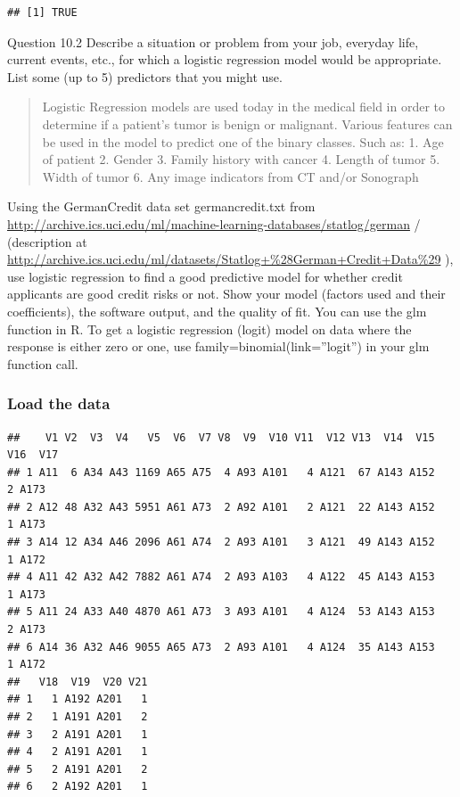 \documentclass[]{article}
\newenvironment{Shaded}{\begin{snugshade}}{\end{snugshade}}
\newcommand{\KeywordTok}[1]{\textcolor[rgb]{0.13,0.29,0.53}{\textbf{#1}}}
\newcommand{\DataTypeTok}[1]{\textcolor[rgb]{0.13,0.29,0.53}{#1}}
\newcommand{\StringTok}[1]{\textcolor[rgb]{0.31,0.60,0.02}{#1}}
\newcommand{\OtherTok}[1]{\textcolor[rgb]{0.56,0.35,0.01}{#1}}
\newcommand{\OperatorTok}[1]{\textcolor[rgb]{0.81,0.36,0.00}{\textbf{#1}}}
\newcommand{\NormalTok}[1]{#1}
\begin{document}
\begin{verbatim}
## [1] TRUE
\end{verbatim}

Question 10.2 Describe a situation or problem from your job, everyday
life, current events, etc., for which a logistic regression model would
be appropriate. List some (up to 5) predictors that you might use.

\begin{quote}
Logistic Regression models are used today in the medical field in order
to determine if a patient's tumor is benign or malignant. Various
features can be used in the model to predict one of the binary classes.
Such as: 1. Age of patient 2. Gender 3. Family history with cancer 4.
Length of tumor 5. Width of tumor 6. Any image indicators from CT and/or
Sonograph
\end{quote}

Using the GermanCredit data set germancredit.txt from
\url{http://archive.ics.uci.edu/ml/machine-learning-databases/statlog/german}
/ (description at
\url{http://archive.ics.uci.edu/ml/datasets/Statlog+\%28German+Credit+Data\%29}
), use logistic regression to find a good predictive model for whether
credit applicants are good credit risks or not. Show your model (factors
used and their coefficients), the software output, and the quality of
fit. You can use the glm function in R. To get a logistic regression
(logit) model on data where the response is either zero or one, use
family=binomial(link=''logit'') in your glm function call.

\subsubsection{Load the data}\label{load-the-data}

\begin{Shaded}
\end{Shaded}

\begin{verbatim}
##    V1 V2  V3  V4   V5  V6  V7 V8  V9  V10 V11  V12 V13  V14  V15 V16  V17
## 1 A11  6 A34 A43 1169 A65 A75  4 A93 A101   4 A121  67 A143 A152   2 A173
## 2 A12 48 A32 A43 5951 A61 A73  2 A92 A101   2 A121  22 A143 A152   1 A173
## 3 A14 12 A34 A46 2096 A61 A74  2 A93 A101   3 A121  49 A143 A152   1 A172
## 4 A11 42 A32 A42 7882 A61 A74  2 A93 A103   4 A122  45 A143 A153   1 A173
## 5 A11 24 A33 A40 4870 A61 A73  3 A93 A101   4 A124  53 A143 A153   2 A173
## 6 A14 36 A32 A46 9055 A65 A73  2 A93 A101   4 A124  35 A143 A153   1 A172
##   V18  V19  V20 V21
## 1   1 A192 A201   1
## 2   1 A191 A201   2
## 3   2 A191 A201   1
## 4   2 A191 A201   1
## 5   2 A191 A201   2
## 6   2 A192 A201   1
\end{verbatim}
\end{document}
